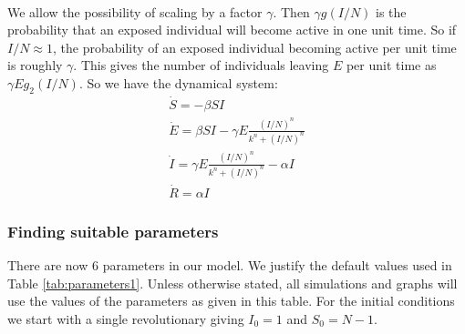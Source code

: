 \\
We allow the possibility of scaling by a factor $\gamma$. Then $\gamma g(I/N)$ is the probability that an exposed individual will become active in one unit time. So if $I/N\approx1$, the probability of an exposed individual becoming active per unit time is roughly $\gamma$. This gives the number of individuals leaving $E$ per unit time as $\gamma Eg_2(I/N)$. So we have the dynamical system:
\begin{eqnarray}
\dot S=-\beta S I\\
\dot E=\beta S I- \gamma E \frac{(I/N)^n}{k^n + (I/N)^n}\\
\dot I= \gamma E \frac{(I/N)^n}{k^n + (I/N)^n}-\alpha I\\
\dot R=\alpha I\label{rev1eq4}
\end{eqnarray}
\subsubsection{Finding suitable parameters}
There are now 6 parameters in our model. We justify the default values used in Table \ref{tab:parameters1}. Unless otherwise stated, all simulations and graphs will use the values of the parameters as given in this table. For the initial conditions we start with a single revolutionary giving $I_0=1$ and $S_0=N-1$.
